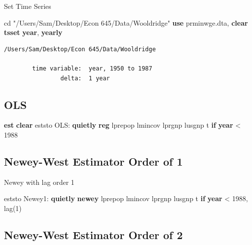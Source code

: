 \documentclass[
]{book}
\newenvironment{Shaded}{\begin{snugshade}}{\end{snugshade}}
\newcommand{\FunctionTok}[1]{\textcolor[rgb]{0.13,0.29,0.53}{\textbf{#1}}}
\newcommand{\KeywordTok}[1]{\textcolor[rgb]{0.13,0.29,0.53}{\textbf{#1}}}
\newcommand{\NormalTok}[1]{#1}
\newcommand{\StringTok}[1]{\textcolor[rgb]{0.31,0.60,0.02}{#1}}
\begin{document}
Set Time Series

\begin{Shaded}
\begin{Highlighting}[]
\NormalTok{cd }\StringTok{"/Users/Sam/Desktop/Econ 645/Data/Wooldridge"}
\KeywordTok{use}\NormalTok{ prminwge.dta, }\KeywordTok{clear}
\KeywordTok{tsset} \FunctionTok{year}\NormalTok{, }\FunctionTok{yearly}
\end{Highlighting}
\end{Shaded}

\begin{verbatim}
/Users/Sam/Desktop/Econ 645/Data/Wooldridge

        time variable:  year, 1950 to 1987
                delta:  1 year
\end{verbatim}

\subsection*{OLS}\label{ols-2}

\begin{Shaded}
\begin{Highlighting}[]
\KeywordTok{est} \KeywordTok{clear}
\NormalTok{eststo OLS: }\KeywordTok{quietly} \KeywordTok{reg}\NormalTok{ lprepop lmincov lprgnp lusgnp t }\KeywordTok{if} \FunctionTok{year}\NormalTok{ \textless{} 1988}
\end{Highlighting}
\end{Shaded}

\subsection*{Newey-West Estimator Order of 1}\label{newey-west-estimator-order-of-1}

Newey with lag order 1

\begin{Shaded}
\begin{Highlighting}[]
\NormalTok{eststo Newey1: }\KeywordTok{quietly} \KeywordTok{newey}\NormalTok{ lprepop lmincov lprgnp lusgnp t }\KeywordTok{if} \FunctionTok{year}\NormalTok{ \textless{} 1988, lag(1)}
\end{Highlighting}
\end{Shaded}

\subsection*{Newey-West Estimator Order of 2}\label{newey-west-estimator-order-of-2}
\end{document}
